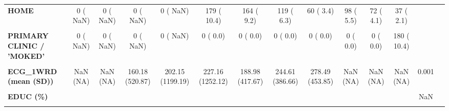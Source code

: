 \documentclass[
]{article}
\begin{document}
\begin{table}[H]
\begin{tabular}[t]{>{\raggedright\arraybackslash}p{5em}ccccccccccccc}
\textbf{HOME} & 0 (  NaN) & 0 (  NaN) & 0 (  NaN) & 0 (  NaN) & 179 ( 10.4) & 164 (  9.2) & 119 (  6.3) & 60 (  3.4) & 98 (  5.5) & 72 (  4.1) & 37 (  2.1) &  & \\
\textbf{\cellcolor{gray!10}{HOSPITAL WARD}} & \cellcolor{gray!10}{0 (  NaN)} & \cellcolor{gray!10}{0 (  NaN)} & \cellcolor{gray!10}{0 (  NaN)} & \cellcolor{gray!10}{0 (  NaN)} & \cellcolor{gray!10}{72 (  4.2)} & \cellcolor{gray!10}{94 (  5.3)} & \cellcolor{gray!10}{78 (  4.1)} & \cellcolor{gray!10}{68 (  3.8)} & \cellcolor{gray!10}{84 (  4.7)} & \cellcolor{gray!10}{61 (  3.5)} & \cellcolor{gray!10}{97 (  5.6)} & \cellcolor{gray!10}{} & \cellcolor{gray!10}{}\\
\textbf{PRIMARY CLINIC / 'MOKED'} & 0 (  NaN) & 0 (  NaN) & 0 (  NaN) & 0 (  NaN) & 0 (  0.0) & 0 (  0.0) & 0 (  0.0) & 0 (  0.0) & 0 (  0.0) & 0 (  0.0) & 180 ( 10.4) &  & \\
\textbf{\cellcolor{gray!10}{PRIMARY CLINIC / MOKED}} & \cellcolor{gray!10}{0 (  NaN)} & \cellcolor{gray!10}{0 (  NaN)} & \cellcolor{gray!10}{0 (  NaN)} & \cellcolor{gray!10}{0 (  NaN)} & \cellcolor{gray!10}{0 (  0.0)} & \cellcolor{gray!10}{291 ( 16.4)} & \cellcolor{gray!10}{370 ( 19.6)} & \cellcolor{gray!10}{393 ( 21.9)} & \cellcolor{gray!10}{332 ( 18.7)} & \cellcolor{gray!10}{266 ( 15.2)} & \cellcolor{gray!10}{0 (  0.0)} & \cellcolor{gray!10}{} & \cellcolor{gray!10}{}\\
\textbf{ECG\_1WRD (mean (SD))} & NaN (NA) & NaN (NA) & 160.18 (520.87) & 202.15 (1199.19) & 227.16 (1252.12) & 188.98 (417.67) & 244.61 (386.66) & 278.49 (453.85) & NaN (NA) & NaN (NA) & NaN (NA) & 0.001 & \\
\textbf{\cellcolor{gray!10}{ECG\_REP (mean (SD))}} & \cellcolor{gray!10}{NaN (NA)} & \cellcolor{gray!10}{NaN (NA)} & \cellcolor{gray!10}{149.91 (330.86)} & \cellcolor{gray!10}{167.77 (824.62)} & \cellcolor{gray!10}{112.20 (113.94)} & \cellcolor{gray!10}{109.54 (82.97)} & \cellcolor{gray!10}{118.26 (165.15)} & \cellcolor{gray!10}{96.80 (106.36)} & \cellcolor{gray!10}{NaN (NA)} & \cellcolor{gray!10}{NaN (NA)} & \cellcolor{gray!10}{NaN (NA)} & \cellcolor{gray!10}{0.015} & \cellcolor{gray!10}{}\\
\textbf{EDUC (\%)} &  &  &  &  &  &  &  &  &  &  &  & NaN & \\
\textbf{\cellcolor{gray!10}{ELEMENTARY}} & \cellcolor{gray!10}{0 (  NaN)} & \cellcolor{gray!10}{0 (  NaN)} & \cellcolor{gray!10}{0 (  NaN)} & \cellcolor{gray!10}{0 (  NaN)} & \cellcolor{gray!10}{0 (  NaN)} & \cellcolor{gray!10}{394 ( 26.4)} & \cellcolor{gray!10}{480 ( 32.8)} & \cellcolor{gray!10}{321 ( 29.4)} & \cellcolor{gray!10}{260 ( 28.3)} & \cellcolor{gray!10}{273 ( 21.3)} & \cellcolor{gray!10}{226 ( 21.2)} & \cellcolor{gray!10}{} & \cellcolor{gray!10}{}\\

\end{tabular}
\end{table}
\end{document}

